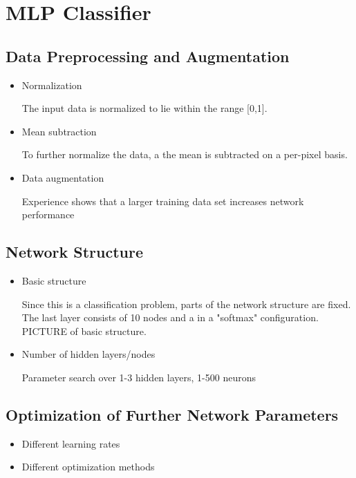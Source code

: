 \section{MLP Classifier}
	    \pagestyle{mario}
	   
\subsection{Data Preprocessing and Augmentation}
	    
\begin{itemize}
   	\item Normalization
  	
  	The input data is normalized to lie within the range [0,1].
    	
  	\item Mean subtraction
	    	
   	To further normalize the data, a the mean is subtracted on a per-pixel basis.
	    	
   	\item Data augmentation
	    	
   	Experience shows that a larger training data set increases network performance
\end{itemize}
	    
\subsection{Network Structure}
	    
\begin{itemize}
   	\item Basic structure
	    	
   	Since this is a classification problem, parts of the network structure are fixed. The last layer consists of 10 nodes and a in a "softmax" configuration. PICTURE of basic structure.
	    	
	\item Number of hidden layers/nodes
	    	
	Parameter search over 1-3 hidden layers, 1-500 neurons
	    	
	    	
\end{itemize}
	    
	    
\subsection{Optimization of Further Network Parameters}
	    
\begin{itemize}
   	\item Different learning rates
	    	
   	\item Different optimization methods
\end{itemize}